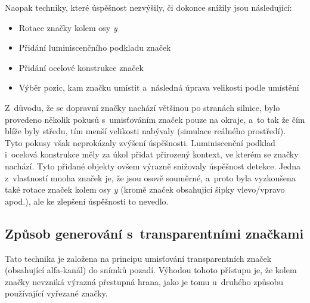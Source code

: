 Naopak techniky, které úspěšnost nezvýšily, či dokonce snížily jsou následující:

\begin{itemize}
    \item Rotace značky kolem osy \emph{y}
    \item Přidání luminiscenčního podkladu značek
    \item Přidání ocelové konstrukce značek
    \item Výběr pozic, kam značku umístit a~následná úprava velikosti podle umístění
\end{itemize}

Z~důvodu, že se dopravní značky nachází většinou po stranách silnice, bylo provedeno několik pokusů s~umisťováním značek pouze na okraje, a~to tak že čím blíže byly středu, tím menší velikosti nabývaly (simulace reálného prostředí). Tyto pokusy však neprokázaly zvýšení úspěšnosti. Luminiscenční podklad i~ocelová konstrukce měly za úkol přidat přirozený kontext, ve kterém se značky nachází. Tyto přidané objekty ovšem výrazně snižovaly úspěšnost detekce. Jedna z~vlastností mnoha značek je, že jsou osově souměrné, a~proto byla vyzkoušena také rotace značek kolem osy \emph{y} (kromě značek obsahující šipky vlevo/vpravo apod.), ale ke zlepšení úspěšnosti to nevedlo.

\subsection*{Způsob generování s~transparentními značkami}
\label{syntDatasetTransparent}
Tato technika je založena na principu umisťování transparentních značek (obsahující alfa-kanál) do snímků pozadí. Výhodou tohoto přístupu je, že kolem značky nevzniká výrazná přestupná hrana, jako je tomu u~druhého způsobu používající vyřezané značky.


